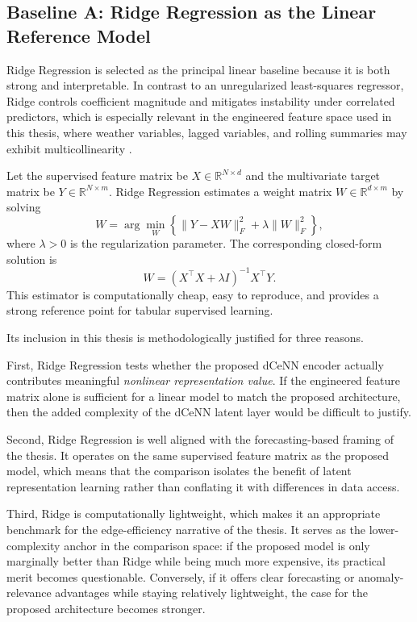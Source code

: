 \subsection{Baseline A: Ridge Regression as the Linear Reference Model}

Ridge Regression is selected as the principal linear baseline because it is both strong and interpretable. In contrast to an unregularized least-squares regressor, Ridge controls coefficient magnitude and mitigates instability under correlated predictors, which is especially relevant in the engineered feature space used in this thesis, where weather variables, lagged variables, and rolling summaries may exhibit multicollinearity \cite{hoerl1970ridge}.

Let the supervised feature matrix be $X \in \mathbb{R}^{N \times d}$ and the multivariate target matrix be $Y \in \mathbb{R}^{N \times m}$. Ridge Regression estimates a weight matrix $W \in \mathbb{R}^{d \times m}$ by solving
\begin{equation}
	W = \arg\min_{W}
	\left\{
	\|Y - XW\|_F^2 + \lambda \|W\|_F^2
	\right\},
	\label{eq:ridge_objective}
\end{equation}
where $\lambda > 0$ is the regularization parameter. The corresponding closed-form solution is
\begin{equation}
	W = (X^{\top}X + \lambda I)^{-1}X^{\top}Y.
	\label{eq:ridge_closed_form}
\end{equation}
This estimator is computationally cheap, easy to reproduce, and provides a strong reference point for tabular supervised learning.

Its inclusion in this thesis is methodologically justified for three reasons.

First, Ridge Regression tests whether the proposed dCeNN encoder actually contributes meaningful \emph{nonlinear representation value}. If the engineered feature matrix alone is sufficient for a linear model to match the proposed architecture, then the added complexity of the dCeNN latent layer would be difficult to justify.

Second, Ridge Regression is well aligned with the forecasting-based framing of the thesis. It operates on the same supervised feature matrix as the proposed model, which means that the comparison isolates the benefit of latent representation learning rather than conflating it with differences in data access.

Third, Ridge is computationally lightweight, which makes it an appropriate benchmark for the edge-efficiency narrative of the thesis. It serves as the lower-complexity anchor in the comparison space: if the proposed model is only marginally better than Ridge while being much more expensive, its practical merit becomes questionable. Conversely, if it offers clear forecasting or anomaly-relevance advantages while staying relatively lightweight, the case for the proposed architecture becomes stronger.

